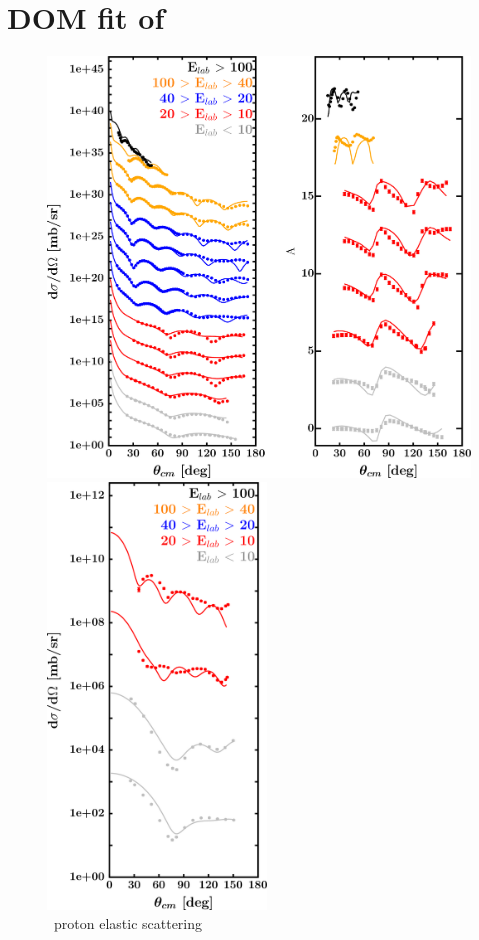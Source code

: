 \section{DOM fit of \caEight}
\label{ca48DOMOutput}
\begin{figure}[hbtp]
    \centering
    \begin{minipage}{0.47\textwidth}
        \centering
        \includegraphics[width=\textwidth]{figures/ca48_protonElastic.png}
        \caption*{\caEight\ proton elastic scattering}
        \label{DOMFitData_ca48_proton_elastic}
    \end{minipage}\hspace{6pt}
    \begin{minipage}{0.47\textwidth}
        \centering
        \includegraphics[width=0.52\textwidth]{figures/ca48_neutronElastic.png}

\end{minipage}
\end{figure}
